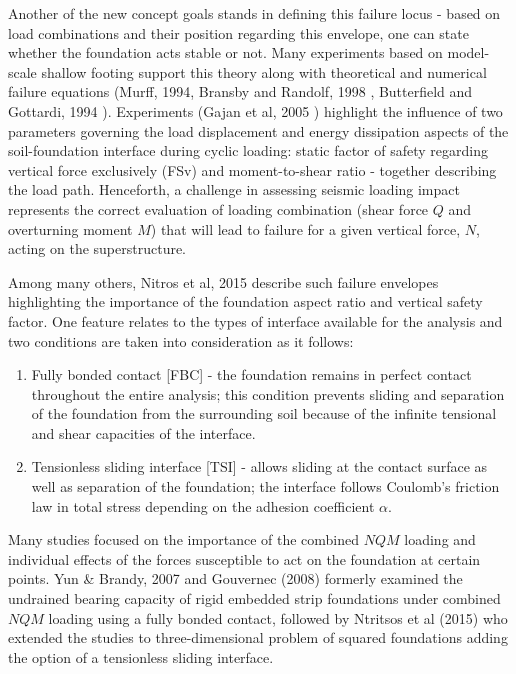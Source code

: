 \documentclass[12pt,a4paper]{report}
\begin{document}
Another of the new concept goals stands in defining this failure locus - based on load combinations and their position regarding this envelope, one can state whether the foundation acts stable or not. Many experiments based on model-scale shallow footing support this theory along with theoretical and numerical failure equations (Murff, 1994, Bransby and Randolf, 1998 \cite{bransby1998combined}, Butterfield and Gottardi, 1994 \cite{gottardi1999plastic}). Experiments (Gajan et al, 2005 \cite{gajan2005centrifuge}) highlight the influence of two \mbox{parameters} governing the load displacement and energy dissipation aspects of the soil-foundation interface during cyclic loading: static factor of safety regarding vertical force exclusively (FSv) and moment-to-shear ratio - together describing the load path. Henceforth, a challenge in assessing seismic loading impact represents the correct evaluation of loading combination (shear force $Q$ and overturning moment $M$) that will lead to failure for a given vertical force, $N$, acting on the superstructure.

 Among many others, Nitros et al, 2015 \cite{ntritsos2015static} describe such failure envelopes highlighting the importance of the foundation aspect ratio and vertical safety factor. One feature relates to the types of interface available for the analysis and two conditions are taken into consideration as it follows:
\begin{enumerate}
	\item Fully bonded contact [FBC] - the foundation remains in perfect contact throughout the entire analysis; this condition prevents sliding and separation of the foundation from the surrounding soil because of the infinite tensional and shear capacities of the interface.
	\item Tensionless sliding interface [TSI] - allows sliding at the contact surface as well as separation of the foundation; the interface follows Coulomb's friction law in total stress depending on the adhesion coefficient $\alpha$.
\end{enumerate}

Many studies focused on the importance of the combined $NQM$ loading and individual effects of the forces susceptible to act on the foundation at certain points. Yun \& Brandy, 2007 and Gouvernec (2008) \cite{randolph2011offshore} formerly examined the undrained bearing capacity of rigid embedded strip foundations under combined $NQM$ loading using a fully bonded contact, followed by Ntritsos et al (2015) who extended the studies to three-dimensional problem of squared foundations adding the option of a tensionless sliding interface.
\end{document}
